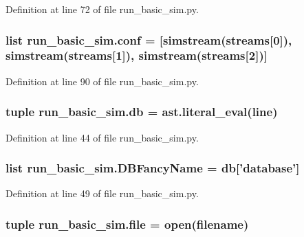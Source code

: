 Definition at line 72 of file run\-\_\-basic\-\_\-sim.\-py.

\hypertarget{namespacerun__basic__sim_ae462ec6ba5f539a8854681e7c134eff7}{
\subsubsection[{conf}]{\setlength{\rightskip}{0pt plus 5cm}list run\-\_\-basic\-\_\-sim.\-conf = \mbox{[}simstream({\bf streams}\mbox{[}0\mbox{]}), simstream({\bf streams}\mbox{[}1\mbox{]}), simstream({\bf streams}\mbox{[}2\mbox{]})\mbox{]}}}\label{namespacerun__basic__sim_ae462ec6ba5f539a8854681e7c134eff7}


Definition at line 90 of file run\-\_\-basic\-\_\-sim.\-py.

\hypertarget{namespacerun__basic__sim_a5db58d711903c4ee3e7e9450e4d37108}{
\subsubsection[{db}]{\setlength{\rightskip}{0pt plus 5cm}tuple run\-\_\-basic\-\_\-sim.\-db = ast.\-literal\-\_\-eval({\bf line})}}\label{namespacerun__basic__sim_a5db58d711903c4ee3e7e9450e4d37108}


Definition at line 44 of file run\-\_\-basic\-\_\-sim.\-py.

\hypertarget{namespacerun__basic__sim_a1fe2db74b7d731cfc500bb312576f95f}{
\subsubsection[{D\-B\-Fancy\-Name}]{\setlength{\rightskip}{0pt plus 5cm}list run\-\_\-basic\-\_\-sim.\-D\-B\-Fancy\-Name = {\bf db}\mbox{[}'database'\mbox{]}}}\label{namespacerun__basic__sim_a1fe2db74b7d731cfc500bb312576f95f}


Definition at line 49 of file run\-\_\-basic\-\_\-sim.\-py.

\hypertarget{namespacerun__basic__sim_a6afc5df7c72945bb7e6876aae0c91c0e}{
\subsubsection[{file}]{\setlength{\rightskip}{0pt plus 5cm}tuple run\-\_\-basic\-\_\-sim.\-file = open({\bf filename})}}\label{namespacerun__basic__sim_a6afc5df7c72945bb7e6876aae0c91c0e}


